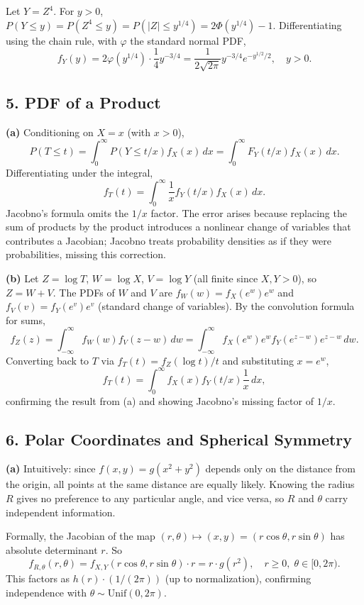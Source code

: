 \documentclass{article}
\begin{document}
Let $Y=Z^4$. For $y>0$, $P(Y\le y)=P(Z^4\le y)=P(|Z|\le y^{1/4})=2\Phi(y^{1/4})-1$. Differentiating using the chain rule, with $\varphi$ the standard normal PDF,
$$
f_Y(y) = 2\varphi(y^{1/4})\cdot\frac{1}{4}y^{-3/4} = \frac{1}{2\sqrt{2\pi}}y^{-3/4}e^{-y^{1/2}/2}, \quad y>0.
$$

\subsection*{5. PDF of a Product}

\textbf{(a)} Conditioning on $X=x$ (with $x>0$),
$$
P(T\le t) = \int_0^\infty P(Y\le t/x)f_X(x)\,dx = \int_0^\infty F_Y(t/x)f_X(x)\,dx.
$$
Differentiating under the integral,
$$
f_T(t) = \int_0^\infty \frac{1}{x}f_Y(t/x)f_X(x)\,dx.
$$
Jacobno's formula omits the $1/x$ factor. The error arises because replacing the sum of products by the product introduces a nonlinear change of variables that contributes a Jacobian; Jacobno treats probability densities as if they were probabilities, missing this correction.

\textbf{(b)} Let $Z=\log T$, $W=\log X$, $V=\log Y$ (all finite since $X,Y>0$), so $Z=W+V$. The PDFs of $W$ and $V$ are $f_W(w)=f_X(e^w)e^w$ and $f_V(v)=f_Y(e^v)e^v$ (standard change of variables). By the convolution formula for sums,
$$
f_Z(z) = \int_{-\infty}^\infty f_W(w)f_V(z-w)\,dw = \int_{-\infty}^\infty f_X(e^w)e^w f_Y(e^{z-w})e^{z-w}\,dw.
$$
Converting back to $T$ via $f_T(t)=f_Z(\log t)/t$ and substituting $x=e^w$,
$$
f_T(t) = \int_0^\infty f_X(x)f_Y(t/x)\frac{1}{x}\,dx,
$$
confirming the result from (a) and showing Jacobno's missing factor of $1/x$.

\subsection*{6. Polar Coordinates and Spherical Symmetry}

\textbf{(a)} Intuitively: since $f(x,y)=g(x^2+y^2)$ depends only on the distance from the origin, all points at the same distance are equally likely. Knowing the radius $R$ gives no preference to any particular angle, and vice versa, so $R$ and $\theta$ carry independent information.

Formally, the Jacobian of the map $(r,\theta)\mapsto(x,y)=(r\cos\theta,r\sin\theta)$ has absolute determinant $r$. So
$$
f_{R,\theta}(r,\theta) = f_{X,Y}(r\cos\theta,r\sin\theta)\cdot r = r\cdot g(r^2), \quad r\ge0,\;\theta\in[0,2\pi).
$$
This factors as $h(r)\cdot(1/(2\pi))$ (up to normalization), confirming independence with $\theta\sim\text{Unif}(0,2\pi)$.
\end{document}
